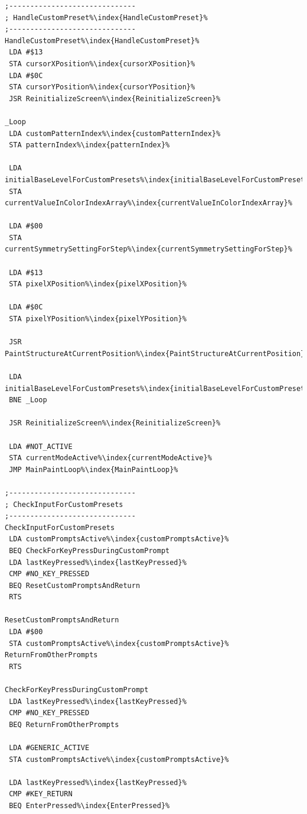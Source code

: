 \begin{minipage}[b]{0.33\linewidth}
\begin{lrbox}{\mybox}%
\begin{lstlisting}[basicstyle=\ttfamily\tiny,escapechar=\%]
;------------------------------
; HandleCustomPreset%\index{HandleCustomPreset}%
;------------------------------
HandleCustomPreset%\index{HandleCustomPreset}%
 LDA #$13
 STA cursorXPosition%\index{cursorXPosition}%
 LDA #$0C
 STA cursorYPosition%\index{cursorYPosition}%
 JSR ReinitializeScreen%\index{ReinitializeScreen}%

_Loop   
 LDA customPatternIndex%\index{customPatternIndex}%
 STA patternIndex%\index{patternIndex}%

 LDA initialBaseLevelForCustomPresets%\index{initialBaseLevelForCustomPresets}%
 STA currentValueInColorIndexArray%\index{currentValueInColorIndexArray}%

 LDA #$00
 STA currentSymmetrySettingForStep%\index{currentSymmetrySettingForStep}%

 LDA #$13
 STA pixelXPosition%\index{pixelXPosition}%

 LDA #$0C
 STA pixelYPosition%\index{pixelYPosition}%

 JSR PaintStructureAtCurrentPosition%\index{PaintStructureAtCurrentPosition}%

 LDA initialBaseLevelForCustomPresets%\index{initialBaseLevelForCustomPresets}%
 BNE _Loop

 JSR ReinitializeScreen%\index{ReinitializeScreen}%

 LDA #NOT_ACTIVE
 STA currentModeActive%\index{currentModeActive}%
 JMP MainPaintLoop%\index{MainPaintLoop}%

;------------------------------
; CheckInputForCustomPresets
;------------------------------
CheckInputForCustomPresets
 LDA customPromptsActive%\index{customPromptsActive}%
 BEQ CheckForKeyPressDuringCustomPrompt
 LDA lastKeyPressed%\index{lastKeyPressed}%
 CMP #NO_KEY_PRESSED
 BEQ ResetCustomPromptsAndReturn
 RTS

ResetCustomPromptsAndReturn
 LDA #$00
 STA customPromptsActive%\index{customPromptsActive}%
ReturnFromOtherPrompts
 RTS

CheckForKeyPressDuringCustomPrompt
 LDA lastKeyPressed%\index{lastKeyPressed}%
 CMP #NO_KEY_PRESSED
 BEQ ReturnFromOtherPrompts

 LDA #GENERIC_ACTIVE
 STA customPromptsActive%\index{customPromptsActive}%

 LDA lastKeyPressed%\index{lastKeyPressed}%
 CMP #KEY_RETURN
 BEQ EnterPressed%\index{EnterPressed}%


\end{lstlisting}
\end{lrbox}
\end{minipage}
